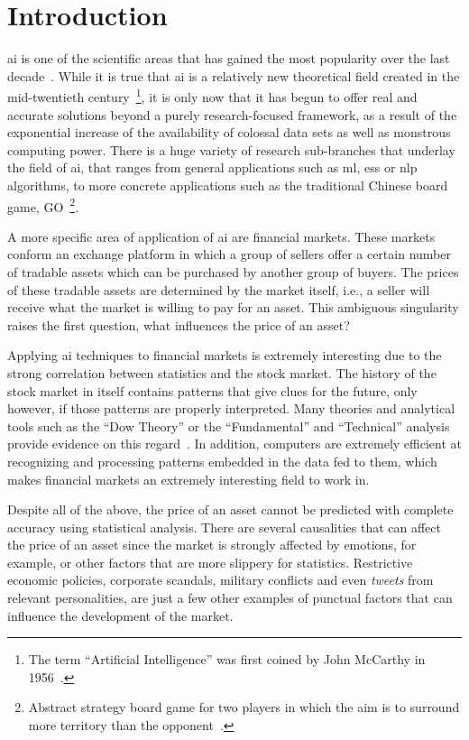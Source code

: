 \chapter{Introduction}
\label{ch:introduccion}

\gls{ai} is one of the scientific areas that has gained the most popularity over the last decade~\cite{iagoogletrend}. While it is true that \gls{ai} is a relatively new theoretical field created in the mid-twentieth century~\footnote{The term \enquote{Artificial Intelligence} was first coined by John McCarthy in 1956~\cite{definitionIaMcCarthy}.}, it is only now that it has begun to offer real and accurate solutions beyond a purely research-focused framework, as a result of the exponential increase of the availability of colossal data sets as well as monstrous computing power. There is a huge variety of research sub-branches that underlay the field of \gls{ai}, that ranges from general applications such as \gls{ml}, \glspl{es} or \gls{nlp} algorithms, to more concrete applications such as the traditional Chinese board game, GO~\footnote{Abstract strategy board game for two players in which the aim is to surround more territory than the opponent~\cite{goDefinition}.}.

A more specific area of application of \gls{ai} are financial markets. These markets conform an exchange platform in which a group of sellers offer a certain number of tradable assets which can be purchased by another group of buyers. The prices of these tradable assets are determined by the market itself, i.e., a seller will receive what the market is willing to pay for an asset. This ambiguous singularity raises the first question, what influences the price of an asset? 

 Applying \gls{ai} techniques to financial markets is extremely interesting due to the strong correlation between statistics and the stock market. The history of the stock market in itself contains patterns that give clues for the future, only however, if those patterns are properly interpreted. Many theories and analytical tools such as the \enquote{Dow Theory} or the \enquote{Fundamental} and \enquote{Technical} analysis provide evidence on this regard~\cite{stockMarketPatterns}. In addition, computers are extremely efficient at recognizing and processing patterns embedded in the data fed to them, which makes financial markets an extremely interesting field to work in.

Despite all of the above, the price of an asset cannot be predicted with complete accuracy using statistical analysis. There are several causalities that can affect the price of an asset since the market is strongly affected by emotions, for example, or other factors that are more slippery for statistics. Restrictive economic policies, corporate scandals, military conflicts and even \textit{tweets} from relevant personalities, are just a few other examples of punctual factors that can influence the development of the market.

